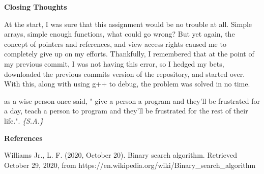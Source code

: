 \documentclass[letterpaper, 10pt]{article}
\begin{document}
\textbf{Closing Thoughts}

At the start, I was sure that this assignment would be no trouble at all. Simple arrays, simple enough functions, what could go wrong? But yet again, the concept of pointers and references, and view access rights caused me to completely give up on my efforts. Thankfully, I remembered that at the point of my previous commit, I was not having this error, so I hedged my bets, downloaded the previous commits version of the repository, and started over. With this, along with using g++ to debug, the problem was solved in no time.
\newline

as a wise person once said, "
give a person a program and they'll be
frustrated for a day, teach a person to
program and they'll be frustrated for the
rest of their life.".
 \vspace{.5em}
{\textit{\color{red}\huge{\{S.A.\}}}}
\vspace{1em}

\newpage
\begin{center}
    \textbf{References}
\end{center}



Williams Jr., L. F. (2020, October 20). Binary search algorithm. 
Retrieved October 29, 2020, from https://en.wikipedia.org/wiki/Binary\_search\_algorithm
\end{document}
